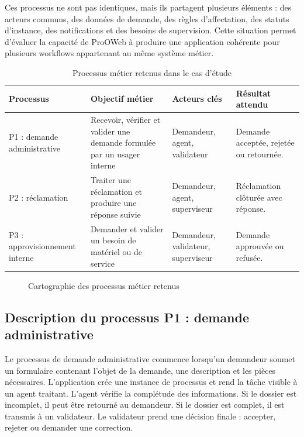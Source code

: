 Ces processus ne sont pas identiques, mais ils partagent plusieurs éléments : des acteurs communs, des données de demande, des règles d'affectation, des statuts d'instance, des notifications et des besoins de supervision. Cette situation permet d'évaluer la capacité de ProOWeb à produire une application cohérente pour plusieurs workflows appartenant au même système métier.

\begin{table}[H]
\centering
\small
\caption{Processus métier retenus dans le cas d'étude}
\label{tab:chap4-processus-retenus}
\begin{tabular}{p{3.2cm}p{4.4cm}p{3.0cm}p{3.4cm}}
\hline
\textbf{Processus} & \textbf{Objectif métier} & \textbf{Acteurs clés} & \textbf{Résultat attendu} \\
\hline
P1 : demande administrative & Recevoir, vérifier et valider une demande formulée par un usager interne & Demandeur, agent, validateur & Demande acceptée, rejetée ou retournée. \\
P2 : réclamation & Traiter une réclamation et produire une réponse suivie & Demandeur, agent, superviseur & Réclamation clôturée avec réponse. \\
P3 : approvisionnement interne & Demander et valider un besoin de matériel ou de service & Demandeur, validateur, superviseur & Demande approuvée ou refusée. \\
\hline
\end{tabular}
\end{table}

\begin{figure}[H]
\centering
{}
\caption{Cartographie des processus métier retenus}
\label{fig:chap4-cartographie-processus}
\end{figure}

\subsection{Description du processus P1 : demande administrative}

Le processus de demande administrative commence lorsqu'un demandeur soumet un formulaire contenant l'objet de la demande, une description et les pièces nécessaires. L'application crée une instance de processus et rend la tâche visible à un agent traitant. L'agent vérifie la complétude des informations. Si le dossier est incomplet, il peut être retourné au demandeur. Si le dossier est complet, il est transmis à un validateur. Le validateur prend une décision finale : accepter, rejeter ou demander une correction.

